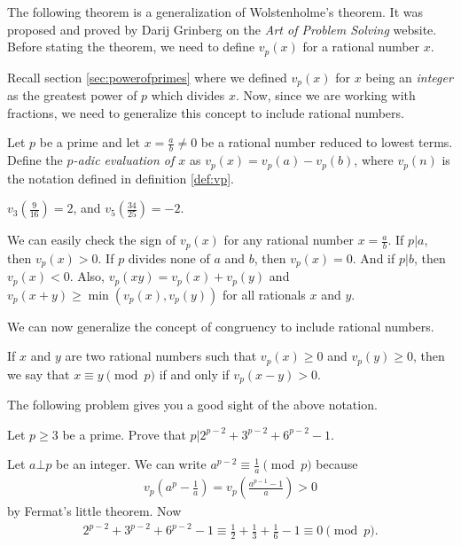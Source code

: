 \documentclass{subfile}
\begin{document}
	The following theorem is a generalization of Wolstenholme's theorem. It was proposed and proved by Darij Grinberg on the \textit{Art of Problem Solving} website. Before stating the theorem, we need to define $v_p(x)$ for a rational number $x$.

	Recall section \eqref{sec:powerofprimes} where we defined $v_p(x)$ for $x$ being an \textit{integer} as the greatest power of $p$ which divides $x$. Now, since we are working with fractions, we need to generalize this concept to include rational numbers.

	\begin{definition}
		Let $p$ be a prime and let $x = \frac{a}{b} \neq 0$ be a rational number reduced to lowest terms. Define the \textit{$p$-adic evaluation of $x$} as $v_p(x) = v_p(a)-v_p(b)$, where $v_p(n)$ is the notation defined in definition \eqref{def:vp}.
	\end{definition}

	\begin{example}
		$v_3\left(\frac{9}{16}\right) = 2$, and $v_5\left(\frac{34}{25}\right) = -2$.
	\end{example}

	\begin{note}
		We can easily check the sign of $v_p(x)$ for any rational number $x=\frac{a}{b}$. If $p|a$, then $v_p(x)>0$. If $p$ divides none of $a$ and $b$, then $v_p(x)=0$. And if $p|b$, then $v_p(x)<0$. Also,  $ v_{p}\left(xy\right) = v_{p}\left(x\right) + v_{p}\left(y\right)$ and $ v_{p}\left(x + y\right)\geq\min\left(v_{p}\left(x\right),v_{p}\left(y\right)\right)$ for all rationals $x$ and $y$.
	\end{note}

	We can now generalize the concept of congruency to include rational numbers.
	\begin{definition}
		If $x$ and $y$ are two rational numbers such that $ v_{p}\left(x\right)\geq 0$ and $ v_{p}\left(y\right)\geq 0$, then we say that $ x\equiv y\pmod p$ if and only if $ v_{p}\left(x - y\right) > 0$.
	\end{definition}

	The following problem gives you a good sight of the above notation.

	\begin{problem}
		Let $p \geq 3$ be a prime. Prove that $p|2^{p-2}+3^{p-2}+6^{p-2}-1$.
	\end{problem}

	\begin{solution}
		Let $a \bot p$ be an integer. We can write $a^{p-2} \equiv \frac{1}{a} \pmod p$ because
			\begin{align*}
				v_p\left(a^p - \frac{1}{a}\right)=v_p\left(\frac{a^{p-1}-1}{a}\right)>0
			\end{align*}
		by Fermat's little theorem. Now
		\begin{align*}
		2^{p-2}+3^{p-2}+6^{p-2}-1 \equiv \frac{1}{2}+\frac{1}{3}+\frac{1}{6}-1 \equiv 0 \pmod p.
		\end{align*}
	\end{solution}
\end{document}
